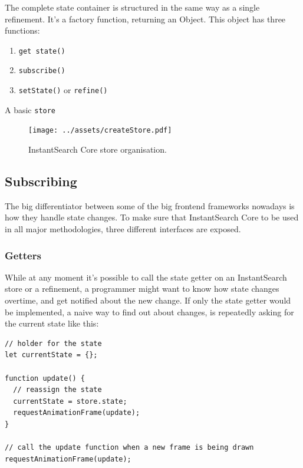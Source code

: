 The complete state container is structured in the same way as a single refinement. It's a factory function, returning an Object. This object has three functions: 

\begin{enumerate}
  \item {\tt get state()}
  \item {\tt subscribe()}
  \item {\tt setState()} or {\tt refine()}
\end{enumerate}

A basic {\tt store}

\begin{figure}[H]
  \centering
  \texttt{[image: ../assets/createStore.pdf]}
  \caption{InstantSearch Core store organisation.}
  \label{figure:createstore_inheritance}
\end{figure}

\subsection{Subscribing}
\label{ssec:Subscribing}

The big differentiator between some of the big frontend frameworks nowadays is how they handle state changes. To make sure that InstantSearch Core to be used in all major methodologies, three different interfaces are exposed.

\subsubsection{Getters}
\label{ssub:getters}

While at any moment it's possible to call the state getter on an InstantSearch store or a refinement, a programmer might want to know how state changes overtime, and get notified about the new change. If only the state getter would be implemented, a naive way to find out about changes, is repeatedly asking for the current state like this:

\begin{lstlisting}[caption={Naive way to find out about changed state},label={lst:is-core-naive-subscribe}]
// holder for the state
let currentState = {};

function update() {
  // reassign the state
  currentState = store.state;
  requestAnimationFrame(update);
}

// call the update function when a new frame is being drawn
requestAnimationFrame(update);
\end{lstlisting}

